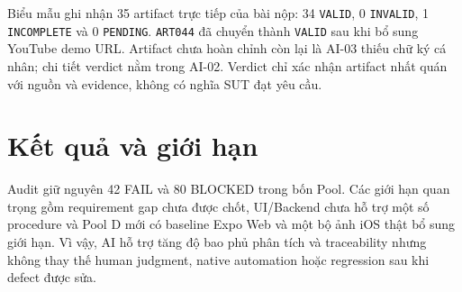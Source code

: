 Biểu mẫu  ghi nhận 35 artifact trực
tiếp của bài nộp: 34 \texttt{VALID}, 0 \texttt{INVALID}, 1 \texttt{INCOMPLETE}
và 0 \texttt{PENDING}. \texttt{ART044} đã chuyển thành \texttt{VALID} sau khi
bổ sung YouTube demo URL. Artifact chưa hoàn chỉnh còn lại là AI-03 thiếu chữ
ký cá nhân; chi tiết verdict nằm trong AI-02. Verdict chỉ xác
nhận artifact nhất quán với nguồn và evidence, không có nghĩa SUT đạt yêu cầu.

\section{Kết quả và giới hạn}

Audit giữ nguyên 42 FAIL và 80 BLOCKED trong bốn Pool. Các giới hạn quan trọng
gồm requirement gap chưa được chốt, UI/Backend chưa hỗ trợ một số procedure và
Pool D mới có baseline Expo Web và một bộ ảnh iOS thật bổ sung giới hạn. Vì vậy,
AI hỗ trợ tăng độ bao phủ phân tích và traceability nhưng không thay thế human
judgment, native automation hoặc regression sau khi defect được sửa.
